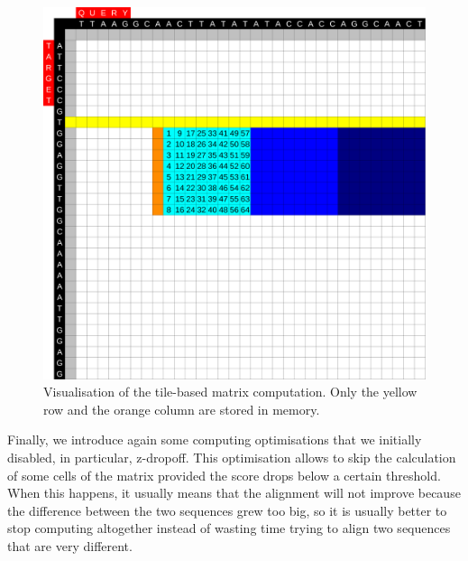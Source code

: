 \begin{figure}[h!]
	\centering
	\includegraphics[width=0.9\linewidth]{visualisation-aid-tile}
	\caption{Visualisation of the tile-based matrix computation. Only the yellow row and the orange column are stored in memory.}
	\label{fig:visualisation-aid-tile}
\end{figure}


Finally, we introduce again some computing optimisations that we initially disabled, in particular, z-dropoff. This optimisation allows to skip the calculation of some cells of the matrix provided the score drops below a certain threshold. When this happens, it usually means that the alignment will not improve because the difference between the two sequences grew too big, so it is usually better to stop computing altogether instead of wasting time trying to align two sequences that are very different.

